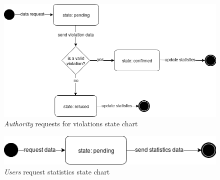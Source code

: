 \documentclass{article}
\begin{document}
\begin{figure}[H]
    \centering
    \includegraphics[scale=0.5]{img/state_charts/authority_request.png}
    \caption{\textit{Authority} requests for violations state chart}
\end{figure}

\begin{figure}[H]
    \centering
    \includegraphics[scale=0.5]{img/state_charts/citizen_request.png}
    \caption{\textit{Users} request statistics state chart}
\end{figure}
\end{document}
